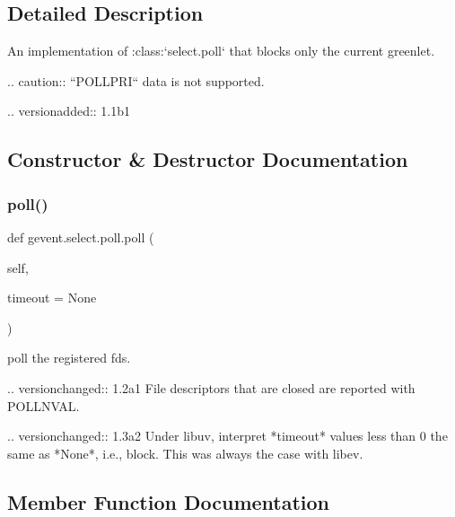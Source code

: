 \subsection{Detailed Description}
\begin{DoxyVerb}An implementation of :class:`select.poll` that blocks only the current greenlet.

.. caution:: ``POLLPRI`` data is not supported.

.. versionadded:: 1.1b1
\end{DoxyVerb}
 

\subsection{Constructor \& Destructor Documentation}
\mbox{\label{classgevent_1_1select_1_1poll_af70f7d5747b1e8750dc9ad6e3173ecdf}} 
\subsubsection{\texorpdfstring{poll()}{poll()}}
{\footnotesize\ttfamily def gevent.\+select.\+poll.\+poll (\begin{DoxyParamCaption}\item[{}]{self,  }\item[{}]{timeout = {\ttfamily None} }\end{DoxyParamCaption})}

\begin{DoxyVerb}poll the registered fds.

.. versionchanged:: 1.2a1
   File descriptors that are closed are reported with POLLNVAL.

.. versionchanged:: 1.3a2
   Under libuv, interpret *timeout* values less than 0 the same as *None*,
   i.e., block. This was always the case with libev.
\end{DoxyVerb}
 

\subsection{Member Function Documentation}
\mbox{\label{classgevent_1_1select_1_1poll_a5aecc5148e5d2f45dc2a6bda4804c135}} 
